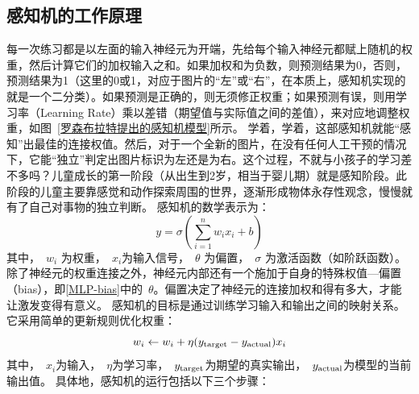 \subsection{感知机的工作原理}


每一次练习都是以左面的输入神经元为开端，先给每个输入神经元都赋上随机的权重，然后计算它们的加权输入之和。如果加权和为负数，则预测结果为0，否则，预测结果为1（这里的0或1，对应于图片的“左”或“右”，在本质上，感知机实现的就是一个二分类）。如果预测是正确的，则无须修正权重；如果预测有误，则用学习率（Learning Rate）乘以差错（期望值与实际值之间的差值），来对应地调整权重，如图~\ref{罗森布拉特提出的感知机模型}所示。
学着，学着，这部感知机就能“感知”出最佳的连接权值。然后，对于一个全新的图片，在没有任何人工干预的情况下，它能“独立”判定出图片标识为左还是为右。这个过程，不就与小孩子的学习差不多吗？儿童成长的第一阶段（从出生到2岁，相当于婴儿期）就是感知阶段。此阶段的儿童主要靠感觉和动作探索周围的世界，逐渐形成物体永存性观念，慢慢就有了自己对事物的独立判断。
感知机的数学表示为：
\begin{equation}\label{MLP-bias}
y = \sigma \left( \sum_{i=1}^n w_i x_i +b\right)
\end{equation}
其中，~$w_i$ 为权重，~$x_i$为输入信号，~$\theta$ 为偏置，~$\sigma$ 为激活函数（如阶跃函数）。
除了神经元的权重连接之外，神经元内部还有一个施加于自身的特殊权值---偏置（bias），即\eqref{MLP-bias}中的~$\theta$。偏置决定了神经元的连接加权和得有多大，才能让激发变得有意义。
感知机的目标是通过训练学习输入和输出之间的映射关系。它采用简单的更新规则优化权重：
 $$ w_i \leftarrow w_i+ \eta ( y_{\rm target}- y_{\rm actual}) x_i$$
 其中，~$x_i$为输入，~$\eta$为学习率，~$ y_{\rm target}$为期望的真实输出，~$ y_{\rm actual}$为模型的当前输出值。
具体地，感知机的运行包括以下三个步骤：
